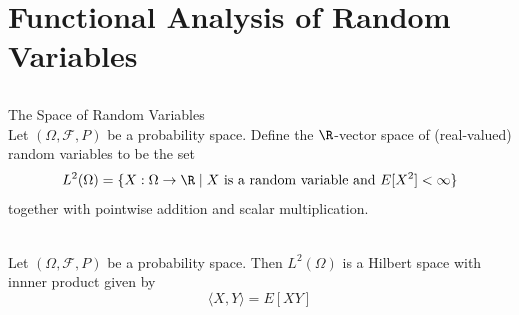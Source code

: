 \documentclass[a4paper]{article}
\begin{document}
\pagebreak
\section{Functional Analysis of Random Variables}
\subsection{}
\begin{defn}{The Space of Random Variables}{}\\
Let $(\Omega,\mathcal{F},P)$ be a probability space. Define the $\R$-vector space of (real-valued) random variables to be the set $$L^2(\Omega)=\{X:\Omega\to\R\;|\;X\text{ is a random variable and }E[X^2]<\infty\}$$ together with pointwise addition and scalar multiplication. 
\end{defn}

\begin{prp}{}{}\\
Let $(\Omega,\mathcal{F},P)$ be a probability space. Then $L^2(\Omega)$ is a Hilbert space with innner product given by $$\langle X,Y\rangle=E[XY]$$
\end{prp}
\end{document}
